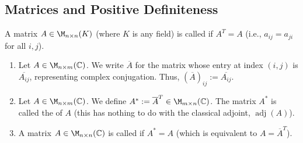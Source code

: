 \subsection{Matrices and Positive Definiteness}

\begin{definition}
    A matrix $A \in \M_{n \times n}(K)$ (where $K$ is any field) is called  if $A^T = A$ (i.e., $a_{ij} = a_{ji}$ for all $i,j$).
\end{definition}

\begin{definition}
    \begin{enumerate}
        \item Let $A \in \M_{n \times m}(\mathbb{C})$. We write $\overline{A}$ for the matrix whose entry at index $(i,j)$ is $\overline{A_{ij}}$, representing complex conjugation. Thus, $(\overline{A})_{ij} := \overline{A_{ij}}$.
        \item Let $A \in \M_{n \times m}(\mathbb{C})$. We define $A^* := \overline{A}^T \in \M_{m \times n}(\mathbb{C})$. The matrix $A^*$ is called the  of $A$ (this has nothing to do with the classical adjoint, $\operatorname{adj}(A)$).
        \item A matrix $A \in \M_{n \times n}(\mathbb{C})$ is called  if $A^* = A$ (which is equivalent to $A = \overline{A}^T$).
    \end{enumerate}
\end{definition}

